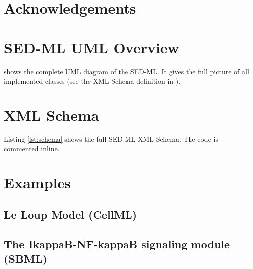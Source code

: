 \documentclass[pdftex,rgb,dvipsnames,svgnames,hyperref,table]{article}
\begin{document}
\section*{Acknowledgements}


\begin{appendix}
\newpage
\section{SED-ML UML Overview}
 shows the complete UML diagram of the SED-ML. It gives the full picture of all implemented classes (see the XML Schema definition in \pageref{lst:schema}).
\label{app:uml}
%
  

\section{XML Schema}
Listing \ref{lst:schema} shows the full SED-ML XML Schema. The code is commented inline.
\label{sec:xmlschema}

\newpage
\section{Examples}

\subsection{Le Loup Model (CellML)}


\newpage
\subsection{The IkappaB-NF-kappaB signaling module (SBML)}


\end{appendix}



\end{document}
